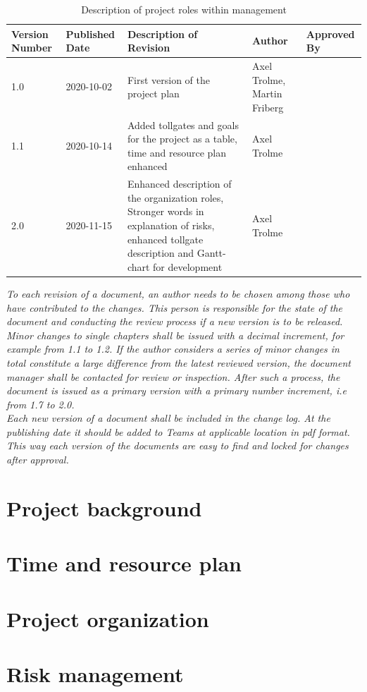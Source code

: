 \documentclass[12pt]{article}
\begin{document}
\begin{table}[H]

\begin{center}
\begin{tabular}{ | m{2cm} |m{2cm} |m{5cm}|m{4cm}|m{3cm}| } 
\hline
{Version Number} & {Published Date} & {Description of Revision}& {Author}& {Approved By} \\ 
\hline
1.0 & 2020-10-02 & First version of the project plan & Axel Trolme, Martin Friberg &  \\
\hline
1.1 & 2020-10-14 & Added tollgates and goals for the project as a table, time and resource plan enhanced & Axel Trolme &  \\
\hline
2.0 & 2020-11-15 & Enhanced description of the organization roles, Stronger words in explanation of risks, enhanced tollgate description and Gantt-chart for development & Axel Trolme & \\ 
\hline
\end{tabular}
\end{center}
\caption{\label{tab:changeLog}Description of project roles within management}
\end{table}
	\textit{To each revision of a document, an author needs to be chosen among those who have contributed to the changes. This person is responsible for the state of the document and conducting the review process if a new version is to be released. Minor changes to single chapters shall be issued with a decimal increment, for example from 1.1 to 1.2. If the author considers a series of minor changes in total constitute a large difference from the latest reviewed version, the document manager shall be contacted for review or inspection. After such a process, the document is issued as a primary version with a primary number increment, i.e from 1.7 to 2.0.} \\ 
	
	\textit{Each new version of a document shall be included in the change log. At the publishing date it should be added to Teams at applicable location in pdf format. This way each version of the documents are easy to find and locked for changes after approval.}
\clearpage

    \section{Project background}
    
    \clearpage
    \section{Time and resource plan}
    
\clearpage
    \section{Project organization}
    
\clearpage
    \section{Risk management}
    
    
\end{document}
